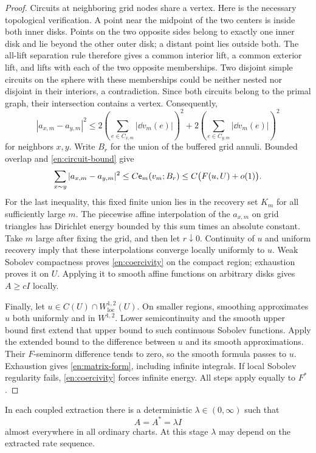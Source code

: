 \begin{proof}
Circuits at neighboring grid nodes share a vertex.  Here is the
necessary topological verification.  A point near the midpoint of the
two centers is inside both inner disks.  Points on the two opposite
sides belong to exactly one inner disk and lie beyond the other outer
disk; a distant point lies outside both.  The all-lift separation rule
therefore gives a common interior lift, a common exterior lift, and
lifts with each of the two opposite memberships.  Two disjoint simple
circuits on the sphere with these memberships could be neither nested
nor disjoint in their interiors, a contradiction.  Since both circuits
belong to the primal graph, their intersection contains a vertex.
Consequently,
\[
 |a_{x,m}-a_{y,m}|^2
 \le 2\left(\sum_{e\in C_{x,m}}|\dd v_m(e)|\right)^2
      +2\left(\sum_{e\in C_{y,m}}|\dd v_m(e)|\right)^2
\]
for neighbors $x,y$.  Write $B_r$ for the union of the buffered grid
annuli.  Bounded overlap and \eqref{en:circuit-bound} give
\[
 \sum_{x\sim y}|a_{x,m}-a_{y,m}|^2
 \le C\mathsf e_m(v_m;B_r)
 \le C\bigl(F(u,U)+o(1)\bigr).
\]
For the last inequality, this fixed finite union lies in the recovery
set $K_m$ for all sufficiently large $m$.
The piecewise affine interpolation of the $a_{x,m}$ on grid triangles
has Dirichlet energy bounded by this sum times an absolute constant.
Take $m$ large after fixing the grid, and then let $r\downarrow0$.
Continuity of $u$ and uniform recovery imply that these interpolations
converge locally uniformly to $u$.  Weak Sobolev compactness proves
\eqref{en:coercivity} on the compact region; exhaustion proves it on
$U$.  Applying it to smooth affine functions on arbitrary disks gives
$A\ge cI$ locally.

Finally, let $u\in C(U)\cap W^{1,2}_{\mathrm{loc}}(U)$.  On smaller
regions, smoothing approximates $u$ both uniformly and in $W^{1,2}$.
Lower semicontinuity and the smooth upper bound first extend that upper
bound to such continuous Sobolev functions.  Apply the extended bound
to the difference between $u$ and its smooth approximations.  Their
$F$-seminorm difference tends to zero, so the smooth formula passes to
$u$.  Exhaustion gives \eqref{en:matrix-form}, including infinite
integrals.  If local Sobolev regularity fails, \eqref{en:coercivity}
forces infinite energy.  All steps apply equally to $F^*$.
\end{proof}

\begin{lemma}\label{en:scalar}
In each coupled extraction there is a deterministic
$\lambda\in(0,\infty)$ such that
\begin{equation}\label{en:scalar-form}
                    A=A^*=\lambda I
\end{equation}
almost everywhere in all ordinary charts.  At this stage $\lambda$
may depend on the extracted rate sequence.
\end{lemma}

